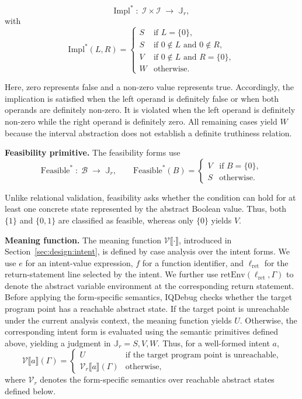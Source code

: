 \documentclass[11pt,oneside]{report}
\theoremstyle{plain}
\theoremstyle{definition}
\theoremstyle{remark}
\begin{document}
\[
\mathrm{Impl}^{*}
\;:\;
\mathcal{I}\times\mathcal{I}
\;\to\;
\mathbb{J}_{r},
\]
with
\[
\mathrm{Impl}^{*}(L,R)
=
\begin{cases}
S & \text{if } L=\{0\}, \\[2pt]
S & \text{if } 0\notin L \text{ and } 0\notin R, \\[2pt]
V & \text{if } 0\notin L \text{ and } R=\{0\}, \\[2pt]
W & \text{otherwise.}
\end{cases}
\]

Here, zero represents false and a non-zero value represents true.
Accordingly, the implication is satisfied when the left operand is definitely
false or when both operands are definitely non-zero.
It is violated when the left operand is definitely non-zero while the right
operand is definitely zero.
All remaining cases yield \(W\) because the interval abstraction does not
establish a definite truthiness relation.

\smallskip
\noindent\textbf{Feasibility primitive.}
The feasibility forms use
\[
\mathrm{Feasible}^{*}
\;:\;
\mathcal{B}
\;\to\;
\mathbb{J}_{r},
\qquad
\mathrm{Feasible}^{*}(B)
=
\begin{cases}
V & \text{if } B=\{0\}, \\
S & \text{otherwise.}
\end{cases}
\]

Unlike relational validation, feasibility asks whether the condition can hold
for at least one concrete state represented by the abstract Boolean value.
Thus, both \(\{1\}\) and \(\{0,1\}\) are classified as feasible, whereas only
\(\{0\}\) yields \(V\).

\smallskip
\noindent\textbf{Meaning function.}
The meaning function
$\mathcal{V}\llbracket\cdot\rrbracket$,
introduced in Section~\ref{sec:design:intent}, is defined by case analysis over
the intent forms.
We use $e$ for an intent-value expression, $f$ for a function identifier,
and $\ell_{\text{ret}}$ for the return-statement line selected by the intent.
We further use
$\mathrm{retEnv}(\ell_{\text{ret}},\Gamma)$
to denote the abstract variable environment at the corresponding return
statement.
Before applying the form-specific semantics, IQDebug checks whether the target
program point has a reachable abstract state.
If the target point is unreachable under the current analysis context, the
meaning function yields $U$.
Otherwise, the corresponding intent form is evaluated using the semantic
primitives defined above, yielding a judgment in
$\mathbb{J}_{r}={S,V,W}$.
Thus, for a well-formed intent $a$,
\[
\mathcal{V}\llbracket a\rrbracket(\Gamma)
=
\begin{cases}
U
& \text{if the target program point is unreachable},\\
\mathcal{V}_{r}\llbracket a\rrbracket(\Gamma)
& \text{otherwise},
\end{cases}
\]
where $\mathcal{V}_{r}$ denotes the form-specific semantics over reachable
abstract states defined below.
\end{document}
